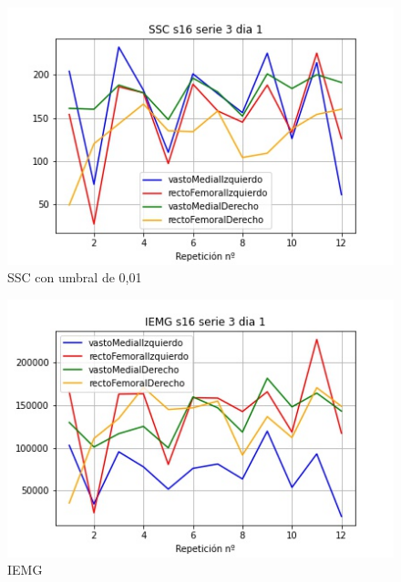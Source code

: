 \begin{figure}[ht]
	\centering
  \includegraphics[width=1.0\textwidth]{imagenes/caracteristicas/SSC s16 serie 3 dia 1.jpg}
  \caption{ SSC con umbral de 0,01}
  \label{fig:ssc}
\end{figure}


\begin{figure}[ht]
	\centering
  \includegraphics[width=1.0\textwidth]{imagenes/caracteristicas/IEMG s16 serie 3 dia 1.jpg}
  \caption{ IEMG}
  \label{fig:iemg}
\end{figure}

